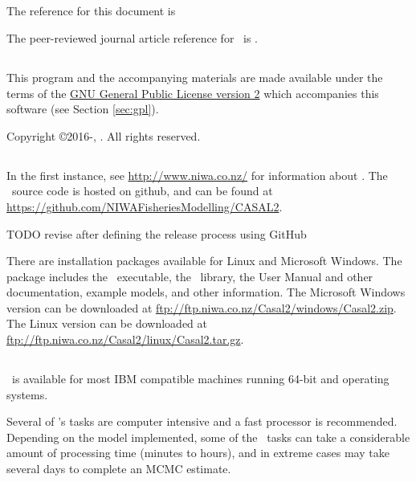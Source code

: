 \subsection{}

The reference for this document is \ManualRef

The peer-reviewed journal article reference for \CNAME\ is \citep{doonan_casal2}.

\subsection{}

This program and the accompanying materials are made available under the terms of the \href{http://www.opensource.org/licenses/GPL-2.0}{GNU General Public License version 2} which accompanies this software (see Section \ref{sec:gpl}).

Copyright \copyright 2016-\SourceControlYearDoc, \href{http://www.niwa.co.nz}{\Organisation}. All rights reserved.

\subsection{}

In the first instance, see \url{http://www.niwa.co.nz/} for information about \CNAME . The \CNAME\ source code is hosted on github, and can be found at \url{https://github.com/NIWAFisheriesModelling/CASAL2}.

TODO revise after defining the release process using GitHub

There are installation packages available for Linux and Microsoft Windows.  The package includes the \CNAME\ executable, the \R\ library, the User Manual and other documentation, example models, and other information. The Microsoft Windows version can be downloaded at \url{ftp://ftp.niwa.co.nz/Casal2/windows/Casal2.zip}. The Linux version can be downloaded at \url{ftp://ftp.niwa.co.nz/Casal2/linux/Casal2.tar.gz}.

\subsection{}

\CNAME\ is available for most IBM compatible machines running 64-bit  and  operating systems.

Several of \CNAME's tasks are computer intensive and a fast processor is recommended. Depending on the model implemented, some of the \CNAME\ tasks can take a considerable amount of processing time (minutes to hours), and in extreme cases may take several days to complete an MCMC estimate. 

